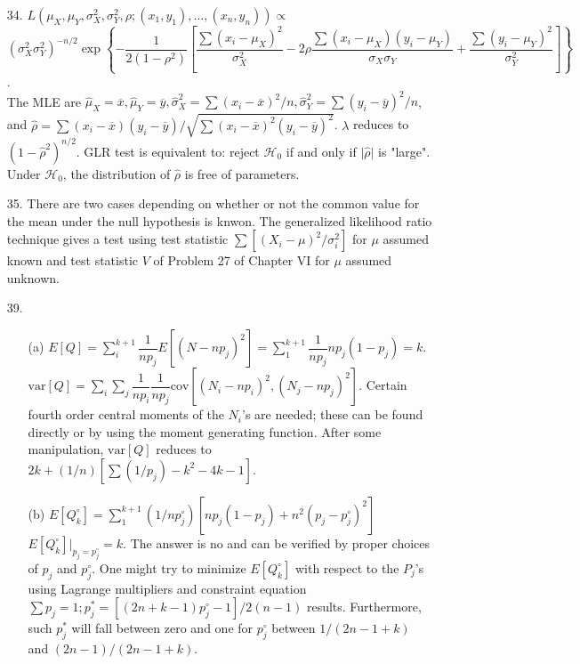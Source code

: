 \begin{enumerate}
	\item[34.] $L(\mu_X,\mu_Y,\sigma_X^2,\sigma_Y^2,\rho; (x_1,y_1),\ldots,(x_n,y_n)) \propto$ \\
	$(\sigma_X^2\sigma_Y^2)^{-n/2}\exp\left\{-\dfrac{1}{2(1-\rho^2)}\left[\dfrac{\sum(x_i-\mu_X)^2}{\sigma_X^2} -2\rho\dfrac{\sum(x_i-\mu_X)(y_i-\mu_Y)}{\sigma_X\sigma_Y} + \dfrac{\sum(y_i-\mu_Y)^2}{\sigma^2_Y}\right]\right\}$. \\
	The MLE are $\hat{\mu}_X=\overline{x},\hat{\mu}_Y=\overline{y}, \hat{\sigma}^2_X=\sum(x_i-\overline{x})^2/n, \hat{\sigma}^2_Y=\sum(y_i-\overline{y})^2/n$, and $\hat{\rho} = \sum(x_i-\overline{x})(y_i-\overline{y})/\sqrt{\sum(x_i-\overline{x})^2(y_i-\overline{y})^2}$. $\lambda$ reduces to $(1-\hat{\rho}^2)^{n/2}$. GLR test is equivalent to: reject $\mathscr{H}_0$ if and only if $\vert\hat{\rho}\vert$ is "large".  Under $\mathscr{H}_0$, the distribution of $\hat{\rho}$ is free of parameters. 
	
	\item[35.] There are two cases depending on whether or not the common value for the mean under the null hypothesis is knwon. The generalized likelihood ratio technique gives a test using test statistic $\sum[(X_i-\mu)^2/\sigma_i^2]$ for $\mu$ assumed known and test statistic $V$ of Problem 27 of Chapter VI for $\mu$ assumed unknown.
	
	\item[39.] \begin{enumerate}
		\item[(a)] $E[Q] = \sum\limits_{i}^{k+1}\dfrac{1}{np_j}E[(N-np_j)^2] = \sum\limits_{1}^{k+1}\dfrac{1}{np_j}np_j(1-p_j) = k$. \\
		$\mbox{var}[Q] = \sum\limits_{i}\sum\limits_{j}\dfrac{1}{np_i}\dfrac{1}{np_j}\mbox{cov}[(N_i-np_i)^2,(N_j-np_j)^2]$. Certain fourth order central moments of the $N_i$'s are needed; these can be found directly or by using the moment generating function. After some manipulation, $\mbox{var}[Q]$ reduces to $2k+(1/n)[\sum(1/p_j) - k^2 -4k -1]$.
	
	\newpage
	
		\item[(b)] $E[Q^\circ_k] = \sum\limits_{1}^{k+1}(1/np^\circ_j)[np_j(1-p_j) + n^2(p_j-p^\circ_j)^2]$ \\
		$E[Q^\circ_k]\Big\vert_{p_j=p^\circ_j} = k$. The answer is no and can be verified by proper choices of $p_j$ and $p^\circ_j$. One might try to minimize $E[Q^\circ_k]$ with respect to the $P_j$'s using Lagrange multipliers and constraint equation $\sum p_j = 1; p_j^*= [(2n+k-1)p^\circ_j-1]/2(n-1)$ results. Furthermore, such $p^*_j$ will fall between zero and one for $p^\circ_j$ between $1/(2n-1+k)$ and $(2n-1)/(2n-1+k)$.
		

\end{enumerate}
\end{enumerate}
